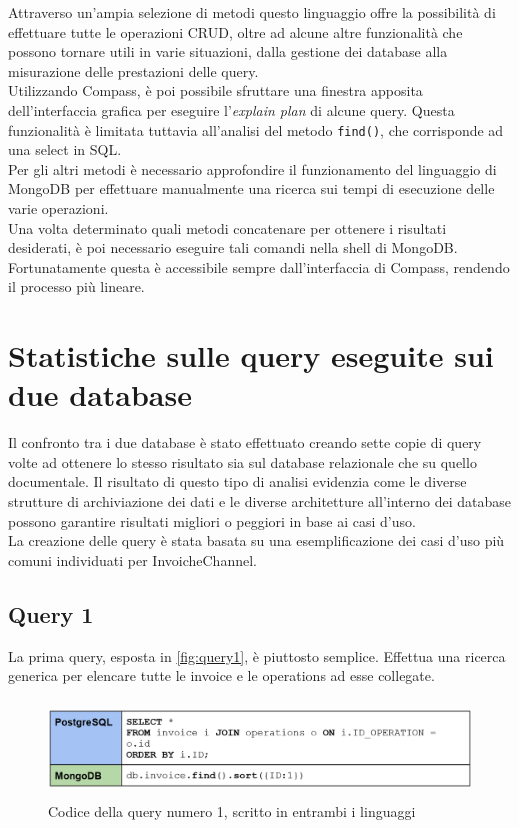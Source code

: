 \noindent Attraverso un'ampia selezione di metodi questo linguaggio offre la possibilità di effettuare tutte le \gls{operazioni CRUD}, oltre ad alcune altre funzionalità che possono tornare utili in varie situazioni, dalla gestione dei database alla misurazione delle prestazioni delle query.\\
Utilizzando Compass, è poi possibile sfruttare una finestra apposita dell'interfaccia grafica per eseguire l'\textit{explain plan} di alcune query\cite{site:mongodbcompass}. Questa funzionalità è limitata tuttavia all'analisi del metodo \texttt{find()}, che corrisponde ad una select in \gls{SQL}.\\
Per gli altri metodi è necessario approfondire il funzionamento del linguaggio di MongoDB per effettuare manualmente una ricerca sui tempi di esecuzione delle varie operazioni.\\
Una volta determinato quali metodi concatenare per ottenere i risultati desiderati, è poi necessario eseguire tali comandi nella shell di MongoDB. Fortunatamente questa è accessibile sempre dall'interfaccia di Compass, rendendo il processo più lineare.\\


\section{Statistiche sulle query eseguite sui due database}
Il confronto tra i due database è stato effettuato creando sette copie di query volte ad ottenere lo stesso risultato sia sul database relazionale che su quello documentale. Il risultato di questo tipo di analisi evidenzia come le diverse strutture di archiviazione dei dati e le diverse architetture all'interno dei database possono garantire risultati migliori o peggiori in base ai casi d'uso.\\
La creazione delle query è stata basata su una esemplificazione dei casi d'uso più comuni individuati per InvoicheChannel.

\subsection{Query 1}
La prima query, esposta in \autoref{fig:query1}, è piuttosto semplice. Effettua una ricerca generica per elencare tutte le invoice e le operations ad esse collegate.\\

\begin{figure}[htbp]
\begin{center}
\includegraphics[height=7em]{immagini/query/query1.png}
\caption{Codice della query numero 1, scritto in entrambi i linguaggi}
\label{fig:query1}
\end{center}
\end{figure}

